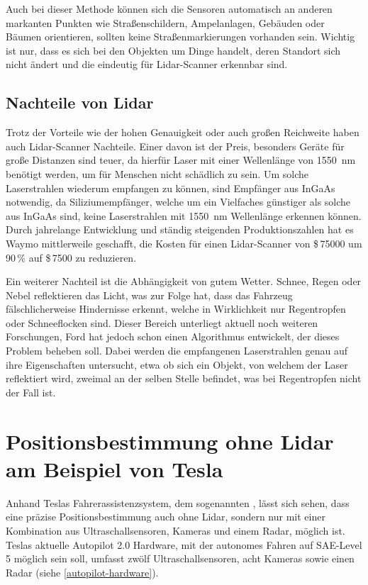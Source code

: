 Auch bei dieser Methode können sich die Sensoren automatisch an anderen markanten Punkten wie Straßenschildern, Ampelanlagen, Gebäuden oder Bäumen orientieren, sollten keine Straßenmarkierungen vorhanden sein. Wichtig ist nur, dass es sich bei den Objekten um Dinge handelt, deren Standort sich nicht ändert und die eindeutig für \acs{Lidar}-Scanner erkennbar sind.

\subsection*{Nachteile von Lidar}

Trotz der Vorteile wie der hohen Genauigkeit oder auch großen Reichweite haben auch \acs{Lidar}-Scanner Nachteile. Einer davon ist der Preis, besonders Geräte für große Distanzen sind teuer, da hierfür Laser mit einer Wellenlänge von \SI{1550}{\nano\meter} benötigt werden, um für Menschen nicht schädlich zu sein. Um solche Laserstrahlen wiederum empfangen zu können, sind Empfänger aus \ac{InGaAs} notwendig, da Siliziumempfänger, welche um ein Vielfaches günstiger als solche aus \ac{InGaAs} sind, keine Laserstrahlen mit \SI{1550}{\nano\meter} Wellenlänge erkennen können.  Durch jahrelange Entwicklung und ständig steigenden Produktionszahlen hat es Waymo mittlerweile geschafft, die Kosten für einen \acs{Lidar}-Scanner von \$\,\num{75000} um 90\,\% auf \$\,\num{7500} zu reduzieren. 

Ein weiterer Nachteil ist die Abhängigkeit von gutem Wetter. Schnee, Regen oder Nebel reflektieren das Licht, was zur Folge hat, dass das Fahrzeug fälschlicherweise Hindernisse erkennt, welche in Wirklichkeit nur Regentropfen oder Schneeflocken sind. Dieser Bereich unterliegt aktuell noch weiteren Forschungen, Ford hat jedoch schon einen Algorithmus entwickelt, der dieses Problem beheben soll. Dabei werden die empfangenen Laserstrahlen genau auf ihre Eigenschaften untersucht, etwa ob sich ein Objekt, von welchem der Laser reflektiert wird, zweimal an der selben Stelle befindet, was bei Regentropfen nicht der Fall ist.


\section{Positionsbestimmung ohne Lidar am Beispiel von Tesla}\label{section-2-3}

Anhand Teslas Fahrerassistenzsystem, dem sogenannten , lässt sich sehen, dass eine präzise Positionsbestimmung auch ohne \acs{Lidar}, sondern nur mit einer Kombination aus Ultraschallsensoren, Kameras und einem \acs{Radar}, möglich ist. Teslas aktuelle Autopilot 2.0 Hardware, mit der autonomes Fahren auf \ac{SAE}-Level 5 möglich sein soll, umfasst zwölf Ultraschallsensoren, acht Kameras sowie einen \acs{Radar} (siehe \ref{autopilot-hardware}).

